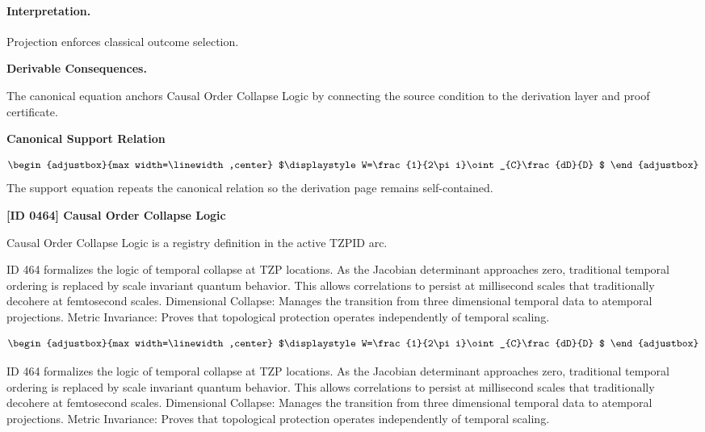 \paragraph{Interpretation.}
Projection enforces classical outcome selection.

\par\vspace{0.35em}
\noindent\textbf{Derivable Consequences.}\quad
\begingroup
\footnotesize
\raggedright
The canonical equation anchors Causal Order Collapse Logic by connecting the source condition to the derivation layer and proof certificate.
\par\endgroup

\noindent\textbf{Canonical Support Relation}\par
\[
\begin{adjustbox}{max width=\linewidth,center}
$\displaystyle
W=\frac{1}{2\pi i}\oint_{C}\frac{dD}{D}
$
\end{adjustbox}
\]
\noindent The support equation repeats the canonical relation so the derivation page remains self-contained.\par

\clearpage
\noindent\textbf{[ID 0464] Causal Order Collapse Logic}\par
\vspace{0.35em}
\begingroup\small
{}
Causal Order Collapse Logic is a registry definition in the active TZPID arc.

ID 464 formalizes the logic of temporal collapse at TZP locations. As the Jacobian determinant approaches zero, traditional temporal ordering is replaced by scale invariant quantum behavior. This allows correlations to persist at millisecond scales that traditionally decohere at femtosecond scales. Dimensional Collapse: Manages the transition from three dimensional temporal data to atemporal projections. Metric Invariance: Proves that topological protection operates independently of temporal scaling.

\[
\begin{adjustbox}{max width=\linewidth,center}
$\displaystyle
W=\frac{1}{2\pi i}\oint_{C}\frac{dD}{D}
$
\end{adjustbox}
\]

ID 464 formalizes the logic of temporal collapse at TZP locations. As the Jacobian determinant approaches zero, traditional temporal ordering is replaced by scale invariant quantum behavior. This allows correlations to persist at millisecond scales that traditionally decohere at femtosecond scales. Dimensional Collapse: Manages the transition from three dimensional temporal data to atemporal projections. Metric Invariance: Proves that topological protection operates independently of temporal scaling.

